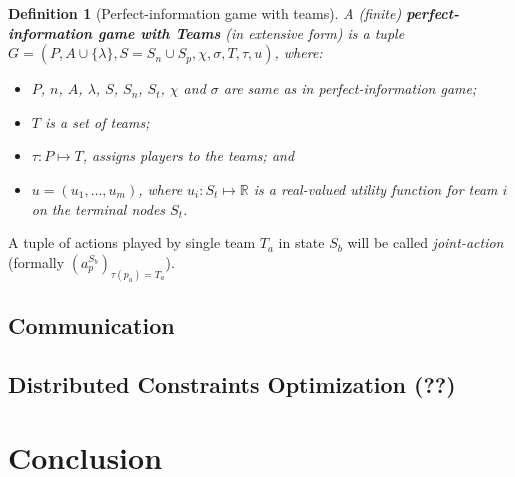 \newtheorem*{defpigt}{Definition}
\begin{defpigt}[Perfect-information game with teams]

A (finite) \textbf{perfect-information game with Teams} (in extensive form) is a tuple $G =
(P,A\cup\{\lambda\}, S=S_n\cup S_p, \chi, \sigma, T, \tau, u)$, where:


\begin{itemize}

\item $P$, $n$, $A$, $\lambda$, $S$, $S_n$, $S_t$, $\chi$ and $\sigma$ are same as in
perfect-information game;

\item $T$ is a set of teams;

\item $\tau: P \mapsto T$, assigns players to the teams; and

\item $u = (u_1,\ldots,u_m)$, where $u_i: S_t \mapsto \mathbb{R}$ is a real-valued utility
function for team $i$ on the terminal nodes $S_t$.



\end{itemize}

\end{defpigt}

A tuple of actions played by single team $T_a$ in state $S_b$ will be called \emph{joint-action} (formally
$(a_p^{S_b})_{\tau(p_a)=T_a}$).

\subsection{Communication}
\subsection{Distributed Constraints Optimization (??)}

\section{Conclusion}
